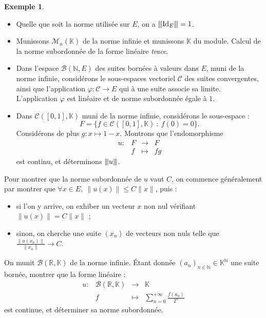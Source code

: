 \documentclass[french]{article}
\newcommand{\N}{\mathbb{N}}
\newcommand{\R}{\mathbb{R}}
\newcommand{\K}{\mathbb{K}}
\newcommand{\vertiii}[1]{{\left\vert\kern-0.25ex\left\vert\kern-0.25ex\left\vert #1 \right\vert\kern-0.25ex\right\vert\kern-0.25ex\right\vert}}
\theoremstyle{plain}
\theoremstyle{definition}
\newtheorem*{ex}{Exemple}
\theoremstyle{remark}
\begin{document}
\begin{ex}
	\begin{itemize}
		\item Quelle que soit la norme utilisée sur $E$, on a $\vertiii{\text{Id}_E}=1$.
		\item Munissons $\mathcal{M}_n(\K)$ de la norme infinie et munissons $\K$ du module. Calcul de la norme subordonnée de la forme linéaire \textit{trace}.
		\item Dans l'espace $\mathcal{B}(\N,E)$ des suites bornées à valeurs dans $E$, muni de la norme infinie, considérons le sous-espaces vectoriel $\mathcal{C}$ des suites convergentes, ainsi que l'application $\varphi:\mathcal{C}\to E$ qui à une suite associe sa limite. L'application $\varphi$ est linéaire et de norme subordonnée égale à $1$.
		\item Dans $\mathcal{C}([0,1],\K)$ muni de la norme infinie, considérons le sous-espace : $$F=\{f\in\mathcal{C}([0,1],\K)\ :\ f(0)=0\}.$$ Considérons de plus $g:x\mapsto 1-x$. Montrons que l'endomorphisme $$\begin{array}{lrcl}
			u:&F&\longrightarrow&F\\
			&f&\longmapsto&fg
		\end{array}$$ est continu, et déterminons $\vertiii{u}$.
	\end{itemize}
\end{ex}

\begin{met}
	Pour montrer que la norme subordonnée de $u$ vaut $C$, on commence généralement par montrer que $\forall x\in E,\ \lVert u(x)\rVert\leqslant C\lVert x\rVert$, puis :
	\begin{itemize}
		\item si l'on y arrive, on exhiber un vecteur $x$ non nul vérifiant $\lVert u(x)\rVert=C\lVert x\rVert$ ;
		\item sinon, on cherche une suite $(x_n)$ de vecteurs non nuls telle que $\displaystyle\frac{\lVert u(x_n)\rVert}{\lVert x_n\rVert}\to C$.
	\end{itemize}
\end{met}

\begin{exo}
	On munit $\mathcal{B}(\R,\K)$ de la norme infinie. Étant donnée $(a_n)_{n\in\N}\in\K^\N$ une suite bornée, montrer que la forme linéaire : $$\begin{array}{lrcl}
		u:&\mathcal{B}(\R,\K)&\longrightarrow&\K\\
		&f&\longmapsto&\displaystyle\sum_{n=0}^{+\infty}\frac{f(a_n)}{2^n}
	\end{array}$$ est continue, et déterminer sa norme subordonnée.
\end{exo}
\end{document}
